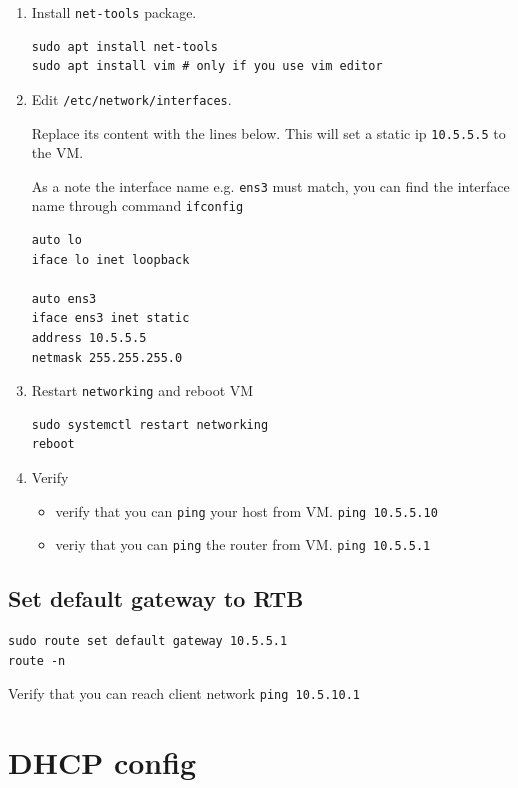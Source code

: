 \documentclass[11pt]{article}
\begin{document}
\begin{enumerate}
\item Install \texttt{net-tools} package.

\begin{verbatim}
sudo apt install net-tools
sudo apt install vim # only if you use vim editor
\end{verbatim}

\item Edit \texttt{/etc/network/interfaces}.

Replace its content with the lines below. This will set a static ip \texttt{10.5.5.5} to the VM.

As a note the interface name e.g. \texttt{ens3} must match, you can find the interface name through command \texttt{ifconfig}

\begin{verbatim}
auto lo
iface lo inet loopback

auto ens3
iface ens3 inet static
address 10.5.5.5
netmask 255.255.255.0
\end{verbatim}

\item Restart \texttt{networking} and reboot VM

\begin{verbatim}
sudo systemctl restart networking
reboot
\end{verbatim}

\item Verify

\begin{itemize}
\item verify that you can \texttt{ping} your host from VM. \texttt{ping 10.5.5.10}
\item veriy that you can \texttt{ping} the router from VM. \texttt{ping 10.5.5.1}
\end{itemize}
\end{enumerate}

\subsection{Set default gateway to RTB}
\label{sec:orgd3c5bf1}

\begin{verbatim}
sudo route set default gateway 10.5.5.1
route -n
\end{verbatim}

Verify that you can reach client network \texttt{ping 10.5.10.1}

\section{DHCP config}
\label{sec:org6725509}
\end{document}

